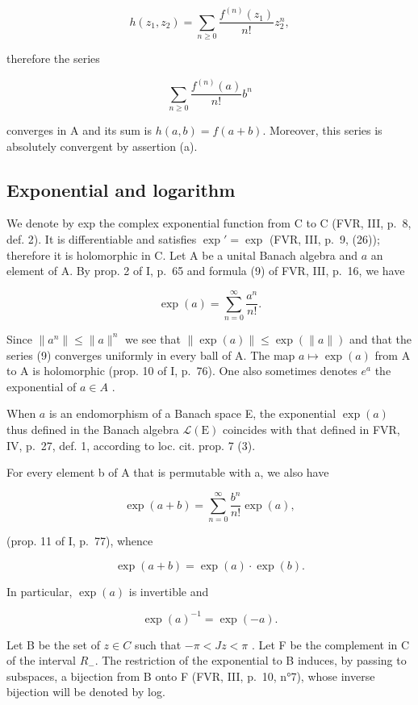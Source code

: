 \[
h (z _ {1}, z _ {2}) = \sum_ {n \geqslant 0} \frac {f ^ {(n)} (z _ {1})}{n !} z _ {2} ^ {n},
\]

therefore the series

\[
\sum_ {n \geqslant 0} \frac {f ^ {(n)} (a)}{n !} b ^ {n}
\]

converges in A and its sum is \(h(a,b)=f(a+b)\). Moreover, this series is absolutely convergent by assertion (a).

\subsection{Exponential and logarithm}

We denote by exp the complex exponential function from C to C (FVR, III, p.~8, def. 2). It is differentiable and satisfies \(\exp' = \exp\) (FVR, III, p.~9, (26)); therefore it is holomorphic in C. Let A be a unital Banach algebra and \(a\) an element of A. By prop. 2 of I, p.~65 and formula (9) of FVR, III, p.~16, we have

\[
\exp (a) = \sum_ {n = 0} ^ {\infty} \frac {a ^ {n}}{n !}.\tag{9}
\]

Since \(\|a^{n}\|\leqslant\|a\|^{n}\) we see that \(\|\exp(a)\|\leqslant\exp(\|a\|)\) and that the series (9) converges uniformly in every ball of A. The map \(a\mapsto\exp(a)\) from A to A is holomorphic (prop. 10 of I, p.~76). One also sometimes denotes \(e^{a}\) the exponential of \(a\in A\) .

When \(a\) is an endomorphism of a Banach space E, the exponential \(\exp(a)\) thus defined in the Banach algebra \(\mathcal{L}(\mathrm{E})\) coincides with that defined in FVR, IV, p.~27, def. 1, according to loc. cit. prop. 7 (3).

For every element b of A that is permutable with a, we also have

\[
\exp (a + b) = \sum_ {n = 0} ^ {\infty} \frac {b ^ {n}}{n !} \exp (a),
\]

(prop. 11 of I, p.~77), whence

\[
\exp (a + b) = \exp (a) \cdot \exp (b).\tag{10}
\]

In particular, \(\exp(a)\) is invertible and

\[
\exp (a) ^ {- 1} = \exp (- a).\tag{11}
\]

Let B be the set of \(z \in C\) such that \(-\pi < Jz < \pi\) . Let F be the complement in C of the interval \(R_{-}\). The restriction of the exponential to B induces, by passing to subspaces, a bijection from B onto F (FVR, III, p.~10, n°7), whose inverse bijection will be denoted by log.


